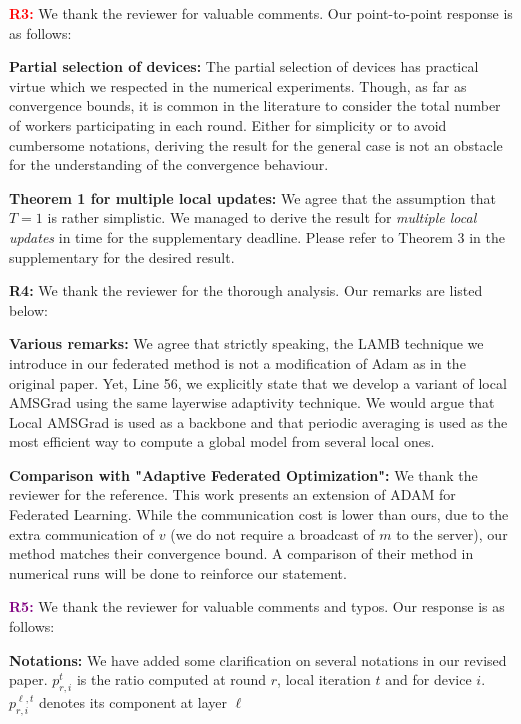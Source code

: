 \documentclass{article}
\begin{document}
\textbf{\textcolor{red}{R3:}} We thank the reviewer for valuable comments.  Our point-to-point response is as follows: \vspace{-5pt}


\textbf{Partial selection of devices:} The partial selection of devices has practical virtue which we respected in the numerical experiments.
Though, as far as convergence bounds, it is common in the literature to consider the total number of workers participating in each round.
Either for simplicity or to avoid cumbersome notations, deriving the result for the general case is not an obstacle for the understanding of the convergence behaviour.

\vspace{-2pt}
\textbf{Theorem 1 for multiple local updates:} 
We agree that the assumption that $T =1$ is rather simplistic.
We managed to derive the result for \emph{multiple local updates} in time for the supplementary deadline.
Please refer to Theorem 3 in the supplementary for the desired result.
 

\textbf{\textcolor{green!50!black}{R4:}} We thank the reviewer for the thorough analysis. Our remarks are listed below: \vspace{-5pt}

\textbf{Various remarks:}
We agree that strictly speaking, the LAMB technique we introduce in our federated method is not a modification of Adam as in the original paper.
Yet, Line 56, we explicitly state that we develop a variant of local AMSGrad using the same layerwise adaptivity technique.
We would argue that Local AMSGrad is used as a backbone and that periodic averaging is used as the most efficient way to compute a global model from several local ones.

\vspace{-2pt}
\textbf{Comparison with "Adaptive Federated Optimization":} 
We thank the reviewer for the reference.
This work presents an extension of ADAM for Federated Learning.
While the communication cost is lower than ours, due to the extra communication of $v$ (we do not require a broadcast of $m$ to the server), our method matches their convergence bound.
A comparison of their method in numerical runs will be done to reinforce our statement.


\textbf{\textcolor{purple}{R5:}} We thank the reviewer for valuable comments and typos. Our response is as follows: \vspace{-5pt}


\textbf{Notations:} We have added some clarification on several notations in our revised paper. 
$p_{r,i}^{t}$ is the ratio computed at round $r$, local iteration $t$ and for device $i$. $p_{r,i}^{\ell,t}$ denotes its component at layer $\ell$
\end{document}
